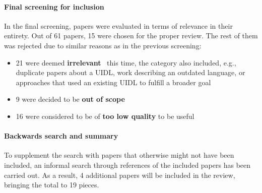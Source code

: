 \paragraph{Final screening for inclusion}

In the final screening, papers were evaluated in terms of relevance in their entirety.
Out of 61 papers, 15 were chosen for the proper review.
The rest of them was rejected due to similar reasons as in the previous screening:
\begin{itemize}
    \item 21 were deemed \textbf{irrelevant} \textendash\ this time, the category also included, e.g., duplicate papers about a UIDL, work describing an outdated language, or approaches that used an existing UIDL to fulfill a broader goal
    \item 9 were decided to be \textbf{out of scope}
    \item 16 were considered to be of \textbf{too low quality} to be useful
\end{itemize}

\paragraph{Backwards search and summary}

To supplement the search with papers that otherwise might not have been included, an informal search through references of the included papers has been carried out.
As a result, 4 additional papers will be included in the review, bringing the total to 19 pieces.


